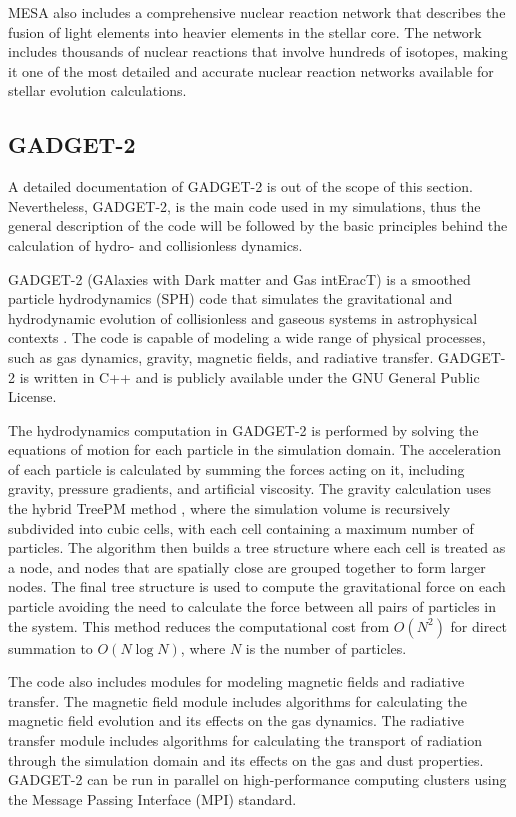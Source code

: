 MESA also includes a comprehensive nuclear reaction network that describes the fusion of light elements into heavier elements in the stellar core. The network includes thousands of nuclear reactions that involve hundreds of isotopes, making it one of the most detailed and accurate nuclear reaction networks available for stellar evolution calculations.


\subsection{GADGET-2}\label{sub:gadget2}

A detailed documentation of GADGET-2 is out of the scope of this section. Nevertheless, GADGET-2, is the main code used in my simulations, thus the general description of the code will be followed by the basic principles behind the calculation of hydro- and collisionless dynamics.

GADGET-2 (GAlaxies with Dark matter and Gas intEracT) is a smoothed particle hydrodynamics (SPH) code that simulates the gravitational and hydrodynamic evolution of collisionless and gaseous systems in astrophysical contexts \citep{springel2005cosmological}. The code is capable of modeling a wide range of physical processes, such as gas dynamics, gravity, magnetic fields, and radiative transfer. GADGET-2 is written in C++ and is publicly available under the GNU General Public License.

The hydrodynamics computation in GADGET-2 is performed by solving the equations of motion for each particle in the simulation domain. The acceleration of each particle is calculated by summing the forces acting on it, including gravity, pressure gradients, and artificial viscosity. The gravity calculation uses the hybrid TreePM method \citep{bode2000tree,bagla2002treepm}, where the simulation volume is recursively subdivided into cubic cells, with each cell containing a maximum number of particles. The algorithm then builds a tree structure where each cell is treated as a node, and nodes that are spatially close are grouped together to form larger nodes. The final tree structure is used to compute the gravitational force on each particle avoiding the need to calculate the force between all pairs of particles in the system. This method reduces the computational cost from $O(N^2)$ for direct summation to $O(N\log N)$, where $N$ is the number of particles.

The code also includes modules for modeling magnetic fields and radiative transfer. The magnetic field module includes algorithms for calculating the magnetic field evolution and its effects on the gas dynamics. The radiative transfer module includes algorithms for calculating the transport of radiation through the simulation domain and its effects on the gas and dust properties. GADGET-2 can be run in parallel on high-performance computing clusters using the Message Passing Interface (MPI) standard.

